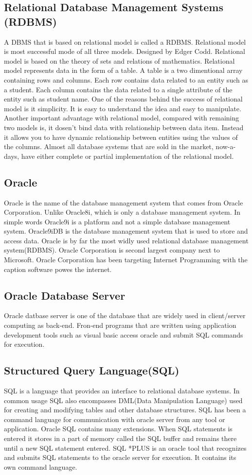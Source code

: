 \documentclass[11pt]{article}
\begin{document}
\subsection{Relational Database Management Systems (RDBMS)}
\label{sec:orgf843185}
A DBMS that is based on relational model is called a RDBMS. Relational model is most successful mode of all three models. Designed by Edger Codd. Relational model is based on the theory of sets and relations of mathematics.
Relational model represents data in the form of a table.
A table is a two dimentional array containing rows and columns. Each row contains data related to an entity such as a student. Each column contains the data related to a single attribute of the entity such as student name.
One of the reasons behind the success of relational model is it simplicity. It is easy to understand the idea and easy to manipulate. Another important advantage with relational model, compared with remaining two models is, it dosen't bind data with relationship between data item. Instead it allows you to have dynamic relationship between entities using the values of the columns.
Almost all database systems that are sold in the market, now-a-days, have either complete or partial implementation of the relational model.
\subsection{Oracle}
\label{sec:orge3ef148}
Oracle is the name of the database management system that comes from Oracle Corporation. Unlike Oracle8i, which is only a database management system. In simple words Oracle9i is a platform and not a simple database management system.
Oracle9iDB is the database management system that is used to store and access data. Oracle is by far the most widly used relational database management system(RDBMS).
Oracle Corporation is second largest company next to Microsoft. Oracle Corporation has been targeting Internet Programming with the caption software powes the internet.
\subsection{Oracle Database Server}
\label{sec:orgd0d9a6d}
Oracle datbase server is one of the database that are widely used in client/server computing as back-end. Fron-end programs that are written using application development tools such as visual basic access oracle and submit SQL commands for execution.
\subsection{Structured Query Language(SQL)}
\label{sec:org5bf1157}
SQL is a language that provides an interface to relational database systems. In common usage SQL also encompasses DML(Data Manipulation Language) used for creating and modifying tables and other database structures.
SQL has been a command language for communication with oracle server from any tool or application. Oracle SQL contains many extensions. When SQL statements is entered it stores in a part of memory called the SQL buffer and remains there until a new SQL statement entered.
SQL *PLUS is an oracle tool that recognizes and submits SQL statements to the oracle server for execution. It
contains its own command language.
\end{document}
